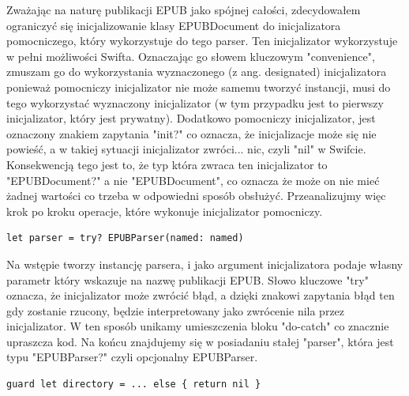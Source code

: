 Zważając na naturę publikacji EPUB jako spójnej całości, zdecydowałem ograniczyć się inicjalizowanie klasy EPUBDocument do inicjalizatora pomocniczego, który wykorzystuje do tego parser. Ten inicjalizator wykorzystuje w pełni możliwości Swifta. Oznaczając go słowem kluczowym "convenience", zmuszam go do wykorzystania wyznaczonego (z ang. designated) inicjalizatora ponieważ pomocniczy inicjalizator nie może samemu tworzyć instancji, musi do tego wykorzystać wyznaczony inicjalizator (w tym przypadku jest to pierwszy inicjalizator, który jest prywatny). Dodatkowo pomocniczy inicjalizator, jest oznaczony znakiem zapytania "init?" co oznacza, że inicjalizacje może się nie powieść, a w takiej sytuacji inicjalizator zwróci... nic, czyli "nil" w Swifcie. Konsekwencją tego jest to, że typ która zwraca ten inicjalizator to "EPUBDocument?" a nie "EPUBDocument", co oznacza że może on nie mieć żadnej wartości co trzeba w odpowiedni sposób obsłużyć. Przeanalizujmy więc krok po kroku operacje, które wykonuje inicjalizator pomocniczy.

\begin{lstlisting}[language=swift-reference]
    let parser = try? EPUBParser(named: named)
\end{lstlisting}

Na wstępie tworzy instancję parsera, i jako argument inicjalizatora podaje własny parametr który wskazuje na nazwę publikacji EPUB. Słowo kluczowe "try" oznacza, że inicjalizator może zwrócić błąd, a dzięki znakowi zapytania błąd ten gdy zostanie rzucony, będzie interpretowany jako zwrócenie nila przez inicjalizator. W ten sposób unikamy umieszczenia bloku "do-catch" co znacznie upraszcza kod. Na końcu znajdujemy się w posiadaniu stałej "parser", która jest typu "EPUBParser?" czyli opcjonalny EPUBParser.

\begin{lstlisting}[language=swift-reference]
  guard let directory = ... else { return nil }
\end{lstlisting}

